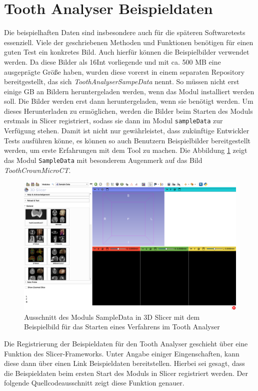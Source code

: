 \section{Tooth Analyser Beispieldaten}
\label{sec:beispieldaten} Die beispielhaften Daten sind insbesondere auch für die
späteren Softwaretests essenziell. Viele der geschriebenen Methoden und
Funktionen benötigen für einen guten Test ein konkretes Bild. Auch hierfür können
die Beispielbilder verwendet werden. Da diese Bilder als \ac{16Int} vorliegende und
mit ca. 500 \ac{MB} eine ausgeprägte Größe haben, wurden diese vorerst in einem
separaten Repository bereitgestellt, das sich \textit{ToothAnalyserSampeData}
nennt. So müssen nicht erst einige \ac{GB} an Bildern heruntergeladen werden, wenn
das Modul installiert werden soll. Die Bilder werden erst dann heruntergeladen, wenn
sie benötigt werden. Um dieses Herunterladen zu ermöglichen, werden die Bilder beim
Starten des Moduls erstmals in Slicer registriert, sodass sie dann im Modul
\texttt{sampleData} zur Verfügung stehen. Damit ist nicht nur gewährleistet, dass
zukünftige Entwickler Tests ausführen könne, es können so auch Benutzern
Beispielbilder bereitgestellt werden, um erste Erfahrungen mit dem Tool zu machen.
Die Abbildung \ref{fig:sample_data} zeigt das Modul \texttt{SampleData} mit besonderem
Augenmerk auf das Bild \textit{ToothCrownMicroCT}.

\begin{figure}[h]
	\centering
	\includegraphics[width=1\textwidth]{img/sampleData.png}
	\caption{Ausschnitt des Moduls SampleData in 3D Slicer mit dem Beispielbild
	für das Starten eines Verfahrens im Tooth Analyser}
	\label{fig:sample_data}
\end{figure}

Die Registrierung der Beispieldaten für den Tooth Analyser geschieht über eine Funktion
des Slicer-Frameworks. Unter Angabe einiger Eingenschaften, kann diese dann über
einen Link Beispieldaten bereitstellen. Hierbei sei gesagt, dass die Beispieldaten beim ersten
Start des Moduls in Slicer registriert werden. Der folgende Quellcodeausschnitt
zeigt diese Funktion genauer.

